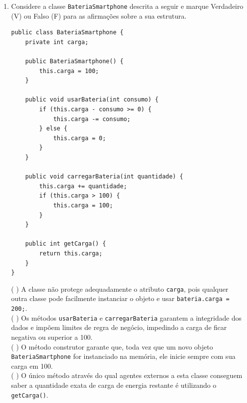 \documentclass[12pt,a4paper]{article}
\begin{document}
\begin{enumerate}
    Qual das opções abaixo representa o código correto para o "\texttt{Metodo Y}", de forma a respeitar o encapsulamento, permitindo que o valor total seja lido, porém sem permitir que o valor do atributo \texttt{totalCompras} seja modificado diretamente de fora da classe?
    \begin{enumerate}[label=\Alph*)]
        \item \texttt{public void setTotalCompras(double total) \{ this.totalCompras = total; \}}
        \item \texttt{public double getTotalCompras() \{ return this.totalCompras; \}}
        \item \texttt{private double lerTotal() \{ return totalCompras; \}}
        \item \texttt{public double getAndSetTotal(double total) \{ this.totalCompras = total; return total; \}}
        \item \texttt{protected void exibirTotal() \{ System.out.println(totalCompras); \}}
    \end{enumerate}

    \vspace{0.3cm}
    
    \item Considere a classe \texttt{BateriaSmartphone} descrita a seguir e marque Verdadeiro (V) ou Falso (F) para as afirmações sobre a sua estrutura.

\begin{lstlisting}
public class BateriaSmartphone {
    private int carga;

    public BateriaSmartphone() {
        this.carga = 100;
    }

    public void usarBateria(int consumo) {
        if (this.carga - consumo >= 0) {
            this.carga -= consumo;
        } else {
            this.carga = 0;
        }
    }
    
    public void carregarBateria(int quantidade) {
        this.carga += quantidade;
        if (this.carga > 100) {
            this.carga = 100;
        }
    }
    
    public int getCarga() {
        return this.carga;
    }
}
\end{lstlisting}

    ( ) A classe não protege adequadamente o atributo \texttt{carga}, pois qualquer outra classe pode facilmente instanciar o objeto e usar \texttt{bateria.carga = 200;}. \\
    ( ) Os métodos \texttt{usarBateria} e \texttt{carregarBateria} garantem a integridade dos dados e impõem limites de regra de negócio, impedindo a carga de ficar negativa ou superior a 100. \\
    ( ) O método construtor garante que, toda vez que um novo objeto \texttt{BateriaSmartphone} for instanciado na memória, ele inicie sempre com sua carga em 100. \\
    ( ) O único método através do qual agentes externos a esta classe conseguem saber a quantidade exata de carga de energia restante é utilizando o \texttt{getCarga()}.
    

\end{enumerate}
\end{document}
